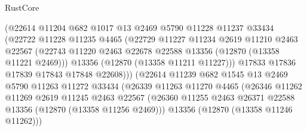 \begin{lexlean}{RustCore}
\begin{coremodule}
                            (@22614
                              @11204
                              @682
                              @1017
                              @13
                              @2469
                              @5790
                              @11228
                              @11237
                              @33434
                              (@22722
                                @11228
                                @11235
                                @4465
                                (@22729
                                  @11227
                                  @11234
                                  @2619
                                  @11210
                                  @2463
                                  @22567
                                  (@22743
                                    @11220
                                    @2463
                                    @22678
                                    @22588
                                    @13356
                                    (@12870 (@13358 @11221 @2469)))
                                  @13356
                                  (@12870 (@13358 @11211 @11227)))
                                @17833
                                @17836
                                @17839
                                @17843
                                @17848
                                @22608)))
                          (@22614
                            @11239
                            @682
                            @1545
                            @13
                            @2469
                            @5790
                            @11263
                            @11272
                            @33434
                            (@26339
                              @11263
                              @11270
                              @4465
                              (@26346
                                @11262
                                @11269
                                @2619
                                @11245
                                @2463
                                @22567
                                (@26360
                                  @11255
                                  @2463
                                  @26371
                                  @22588
                                  @13356
                                  (@12870 (@13358 @11256 @2469)))
                                @13356
                                (@12870 (@13358 @11246 @11262)))

\end{coremodule}
\end{lexlean}
